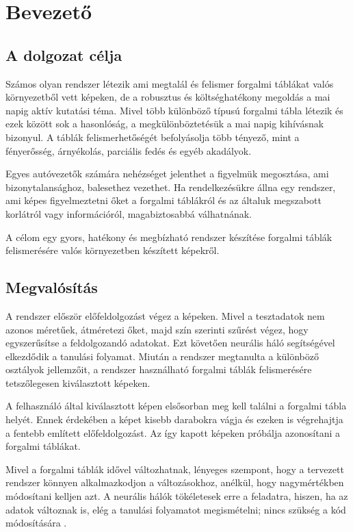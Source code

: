 \chapter{Bevezető}\label{ch:INTRO}

\section{A dolgozat célja}\label{sec:INTRO:goal}
Számos olyan rendszer létezik ami megtalál és felismer forgalmi táblákat valós környezetből vett képeken, de a robusztus és költséghatékony megoldás a mai napig aktív kutatási téma. Mivel több különböző típusú forgalmi tábla létezik és ezek között sok a hasonlóság, a megkülönböztetésük a mai napig kihívásnak bizonyul. A táblák felismerhetőségét befolyásolja több tényező, mint a fényerősség, árnyékolás, parciális fedés és egyéb akadályok.

Egyes autóvezetők számára nehézséget jelenthet a figyelmük megosztása, ami bizonytalansághoz, balesethez vezethet. Ha rendelkezésükre állna egy rendszer, ami képes figyelmeztetni őket a forgalmi táblákról és az általuk megszabott korlátról vagy információról, magabiztosabbá válhatnának.

A célom egy gyors, hatékony és megbízható rendszer készítése forgalmi táblák felismerésére valós környezetben készített képekről.

\section{Megvalósítás}\label{sec:INTRO:implement}

A rendszer először előfeldolgozást végez a képeken. Mivel a tesztadatok nem azonos méretűek, átméretezi őket, majd szín szerinti szűrést végez, hogy egyszerűsítse a feldolgozandó adatokat. Ezt követően neurális háló segítségével elkezdődik a tanulási folyamat. Miután a rendszer megtanulta a különböző osztályok jellemzőit, a rendszer használható forgalmi táblák felismerésére tetszőlegesen kiválasztott képeken.

A felhasználó által kiválasztott képen elsősorban meg kell találni a forgalmi tábla helyét. Ennek érdekében a képet kisebb darabokra vágja és ezeken is végrehajtja a fentebb említett előfeldolgozást. Az így kapott képeken próbálja azonosítani a forgalmi táblákat.

Mivel a forgalmi táblák idővel változhatnak, lényeges szempont, hogy a tervezett rendszer könnyen alkalmazkodjon a változásokhoz, anélkül, hogy nagymértékben módosítani kelljen azt. A neurális hálók tökéletesek erre a feladatra, hiszen, ha az adatok változnak is, elég a tanulási folyamatot megismételni; nincs szükség a kód módosítására \cite{8}.